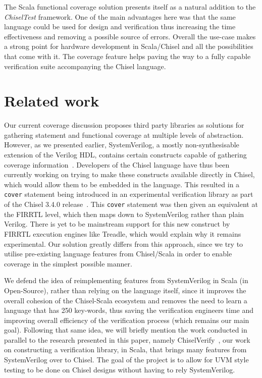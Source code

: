 \documentclass[conference]{IEEEtran}
\begin{document}
The Scala functional coverage solution presents itself as a natural addition to the \textit{ChiselTest} framework. One of the main advantages here was that the same language could be used for design and verification thus increasing the time effectiveness and removing a possible source of errors. Overall the use-case makes a strong point for hardware development in Scala/Chisel and all the possibilities that come with it. The coverage feature helps paving the way to a fully capable verification suite accompanying the Chisel language.

\section{Related work}
Our current coverage discussion proposes third party libraries  as solutions for gathering statement and functional coverage at multiple levels of abstraction. However, as we presented earlier, SystemVerilog, a mostly non-synthesisable extension of the Verilog HDL, contains certain constructs capable of gathering coverage information~\cite{spear2008systemverilog}. Developers of the Chisel language have thus been currently working on trying to make these constructs available directly in Chisel, which would allow them to be embedded in the language. This resulted in a \texttt{cover} statement being introduced in an experimental verification library as part of the Chisel 3.4.0 release~\cite{chisel3.4release_notes}. This \texttt{cover} statement was then given an equivalent at the FIRRTL level, which then maps down to SystemVerilog rather than plain Verilog. There is yet to be mainstream support for this new construct by FIRRTL execution engines like Treadle, which would explain why it remains experimental. Our solution greatly differs from this approach, since we try to utilise pre-existing language features from Chisel/Scala in order to enable coverage in the simplest possible manner. 

We defend the idea of reimplementing features from SystemVerilog in Scala (in Open-Source), rather than relying on the language itself, since it improves the overall cohesion of the Chisel-Scala ecosystem and removes the need to learn a language that has 250 key-words, thus saving the verification engineers time and improving overall efficiency of the verification process (which remains our main goal). Following that same idea, we will briefly mention the work conducted in parallel to the research presented in this paper, namely ChiselVerify~\cite{chiselverify}, our work on constructing a verification library, in Scala, that brings many features from SystemVerilog over to Chisel. The goal of the project is to allow for UVM style testing to be done on Chisel designs without having to rely SystemVerilog. 
\end{document}
